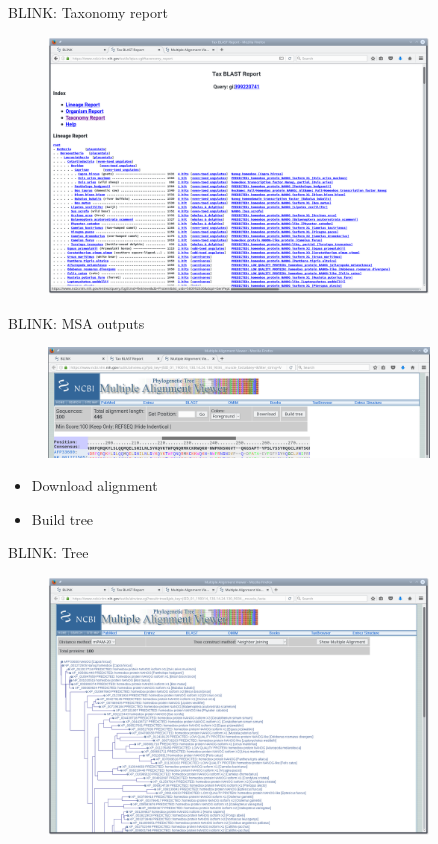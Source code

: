 \documentclass[pdf]{beamer}
\begin{document}
\begin{frame}{BLINK: Taxonomy report}
  \begin{figure}[ht]
    \includegraphics[width=0.9\textwidth]{images/ncbi_blink_5}
  \end{figure}
\end{frame}

\begin{frame}{BLINK: MSA outputs}
  \begin{figure}[ht]
    \includegraphics[width=0.9\textwidth]{images/ncbi_blink_6}
  \end{figure}

  \begin{itemize}
    \item Download alignment
    \item Build tree
  \end{itemize}
\end{frame}

\begin{frame}{BLINK: Tree}
  \begin{figure}[ht]
    \includegraphics[width=0.9\textwidth]{images/ncbi_blink_7}
  \end{figure}
\end{frame}
\end{document}

